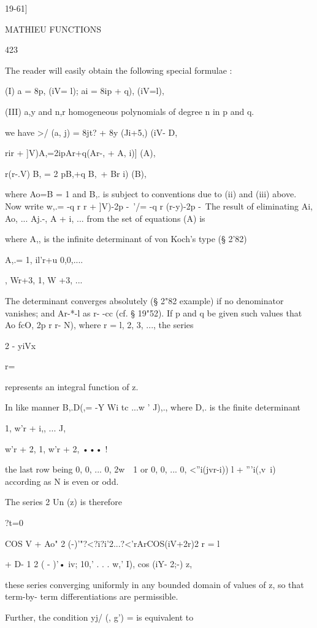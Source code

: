 {{19-61]

MATHIEU FUNCTIONS

423

The reader will easily obtain the following special formulae :

(I) a = 8p, (iV= l); ai = 8ip + q), (iV=l),

(III) a,y and n,r homogeneous polynomials of degree n in p and q.

we have >/ (a, j) = 8jt? + 8y (Ji+5,) (iV- D,

rir + ]V)A,=2ipAr+q(Ar-, + A, i)] (A),

r(r-.V) B, = 2 pB,+q B,\, + Br i) (B),

where Ao=B = 1 and B,. is subject to conventions due to (ii) and (iii)
above. Now write w,.= -q r r + ]V)-2p -\ '/= -q r (r-y)-2p -\ The
result of eliminating Ai, Ao, ... Aj.-, A + i, ... from the set of
equations (A) is

where A,, is the infinite determinant of von Koch's type (§ 2'82)

A,.= 1, il'r+u 0,0,....

, Wr+3, 1, W +3, ...

The determinant converges absolutely (§ 2"82 example) if no
denominator vanishes; and Ar-*-l as r- -cc (cf. § 19"52). If p and q
be given such values that Ao fcO, 2p r r- N), where r = l, 2, 3, ...,
the series

2 - yiVx%

r=\

represents an integral function of z.

In like manner B,.D(,= -Y Wi tc ...w ' J),., where D,. is the finite
determinant

1, w'r + i,, ... J,

w'r + 2, 1, w'r + 2, ••• !

the last row being 0, 0, ... 0, 2w\ \, 1 or 0, 0, ... 0, <''i(jvr-i))
l + '''i(,v\ i) according as N is even or odd.

The series 2 Un (z) is therefore

?t=0

COS V + Ao" 2 (-)'"?<?i?i'2...?<'rArCOS(iV+2r)2 r = l

+ D- 1 2 ( - )'• iv; 10,' . . . w,' I), cos (iY- 2;-) z,

these series converging uniformly in any bounded domain of values of
z, so that term-by- term differentiations are permissible.

Further, the condition yj/ (, g') = is equivalent to

}}
